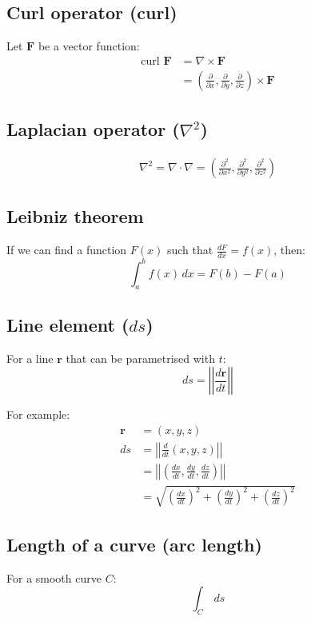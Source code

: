 \documentclass[11pt]{article}
\begin{document}
\subsection{Curl operator (curl)}
\label{sec:org2ce398f}
Let \(\boldsymbol{F}\) be a vector function:
\begin{align*}
\text{curl } \boldsymbol{F} &= \nabla \times \boldsymbol{F} \\
&= \left(\frac{\partial}{\partial x}, \frac{\partial}{\partial y}, \frac{\partial}{\partial z} \right) \times \boldsymbol{F}
\end{align*}

\subsection{Laplacian operator (\(\nabla^2\))}
\label{sec:org44ee998}
\begin{align*}
\nabla^2 = \nabla \cdot \nabla = \left(\frac{\partial^2}{\partial x^2}, \frac{\partial^2}{\partial y^2}, \frac{\partial^2}{\partial z^2}\right)
\end{align*}

\subsection{Leibniz theorem}
\label{sec:org7d2e3d5}
\label{orgc41eb53}
If we can find a function \(F(x)\) such that \(\frac{dF}{dx} = f(x)\), then:
\[\int_a^b f (x) \, dx = F(b) - F(a)\]

\subsection{Line element (\(ds\))}
\label{sec:orge8d32d1}
For a line \(\boldsymbol{r}\) that can be parametrised with \(t\):
\[ds = \left| \left| \frac{d \boldsymbol{r}}{dt} \right| \right|\]

For example:
\begin{align*}
\boldsymbol{r} &= (x, y, z) \\
ds &= \left| \left| \frac{d}{dt} (x, y, z) \right| \right| \\
&= \left| \left| \left(\frac{dx}{dt}, \frac{dy}{dt}, \frac{dz}{dt} \right) \right| \right| \\
&= \sqrt{\left(\frac{dx}{dt} \right)^2 + \left(\frac{dy}{dt} \right)^2 + \left(\frac{dz}{dt} \right)^2}
\end{align*}

\subsection{Length of a curve (arc length)}
\label{sec:orgf36fa35}
For a smooth curve \(C\):
\[\int_C \, ds\]
\end{document}
